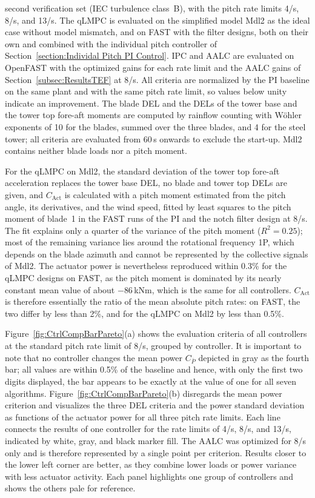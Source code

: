 second verification set (IEC turbulence class~B), with the pitch rate limits 4\textdegree/s,
8\textdegree/s, and 13\textdegree/s. The qLMPC is evaluated on the simplified model Mdl2 as the
ideal case without model mismatch, and on FAST with the filter designs, both on their own
and combined with the individual pitch controller of Section~\ref{section:Individal Pitch PI Control}.
IPC and AALC are evaluated on OpenFAST with the optimized gains for each rate limit and the
AALC gains of Section~\ref{subsec:ResultsTEF} at 8\textdegree/s. All criteria are normalized by the
PI baseline on the same plant and with the same pitch rate limit, so values below unity
indicate an improvement. The blade DEL and the DELs of the tower base and the tower top fore-aft moments are computed by
rainflow counting with W\"ohler exponents of 10 for the blades, summed over the three blades, and
4 for the steel tower; all criteria are evaluated from 60\,s onwards to exclude the start-up. Mdl2 contains neither blade loads nor a pitch moment.


For the qLMPC on Mdl2, the standard deviation of the
tower top fore-aft acceleration replaces the tower base DEL, no blade and tower top DELs are given, and $C_\text{Act}$ is calculated with a pitch moment estimated from the pitch angle, its derivatives, and the wind speed, fitted by least squares to the pitch moment of blade~1 in the FAST runs of the PI and the notch filter design at 8\textdegree/s. The fit explains only a quarter of the variance of the pitch moment ($R^2 = 0.25$); most of the remaining variance lies around the rotational frequency 1P, which depends on the blade azimuth and cannot be represented by the collective signals of Mdl2. The actuator power is nevertheless reproduced within 0.3\% for the qLMPC designs on FAST, as the pitch moment is dominated by its nearly constant mean value of about $-86$\,kNm, which is the same for all controllers. $C_\text{Act}$ is therefore essentially the ratio of the mean absolute pitch rates: on FAST, the two differ by less than 2\%, and for the qLMPC on Mdl2 by less than 0.5\%.

Figure~\ref{fig:CtrlCompBarPareto}(a) shows the evaluation criteria of all controllers at the standard
pitch rate limit of 8\textdegree/s, grouped by controller. It is important to note that no controller changes the mean power
$C_{\bar{P}}$ depicted in gray as the fourth bar; all values are within 0.5\% of the baseline and hence, with only the first two digits displayed, the bar appears to be exactly at the value of one for all seven algorithms. Figure~\ref{fig:CtrlCompBarPareto}(b) disregards the mean power criterion and visualizes the three DEL criteria and the power standard deviation as functions of the actuator power for all three pitch rate limits. Each line connects the
results of one controller for the rate limits of 4\textdegree/s, 8\textdegree/s, and 13\textdegree/s,
indicated by white, gray, and black marker fill. The AALC was optimized for 8\textdegree/s only and
is therefore represented by a single point per criterion. Results closer to the lower left corner
are better, as they combine lower loads or power variance with less actuator activity. Each panel
highlights one group of controllers and shows the others pale for reference.

